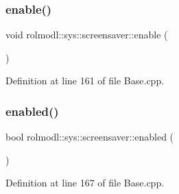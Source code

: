 \subsubsection{\texorpdfstring{enable()}{enable()}}
{\footnotesize\ttfamily void rolmodl\+::sys\+::screensaver\+::enable (\begin{DoxyParamCaption}{ }\end{DoxyParamCaption})\hspace{0.3cm}{\ttfamily [noexcept]}}



Definition at line 161 of file Base.\+cpp.

\mbox{\label{namespacerolmodl_1_1sys_1_1screensaver_ab06a4017c36e60e6d3f00647b9c797c7}} 
\subsubsection{\texorpdfstring{enabled()}{enabled()}}
{\footnotesize\ttfamily bool rolmodl\+::sys\+::screensaver\+::enabled (\begin{DoxyParamCaption}{ }\end{DoxyParamCaption})\hspace{0.3cm}{\ttfamily [noexcept]}}



Definition at line 167 of file Base.\+cpp.

